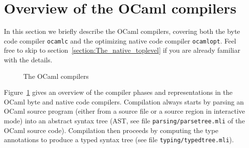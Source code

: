 \documentclass[10pt,a4paper,final,twocolumn]{article}
\begin{document}
\section{Overview of the OCaml compilers} \label{section:Overview_of_the_OCaml_compilers}

In this section we briefly describe the OCaml compilers, covering both the byte code compiler
\texttt{ocamlc} and the optimizing native code compiler \texttt{ocamlopt}.
Feel free to skip to section~\ref{section:The_native_toplevel} if you are already familiar with the details.

\begin{figure}[htb]
  \centering
  \caption{The OCaml compilers}
  \label{fig:The_OCaml_compilers}
\end{figure}

Figure~\ref{fig:The_OCaml_compilers} gives an overview of the compiler phases
and representations in the OCaml byte and native code compilers. Compilation always starts
by parsing an OCaml source program (either from a source file or a source region in
interactive mode) into an abstract syntax tree (AST, see file \texttt{parsing/parsetree.mli}
of the OCaml source code). Compilation then proceeds by computing the type annotations to
produce a typed syntax tree (see file \texttt{typing/typedtree.mli}).
\end{document}
